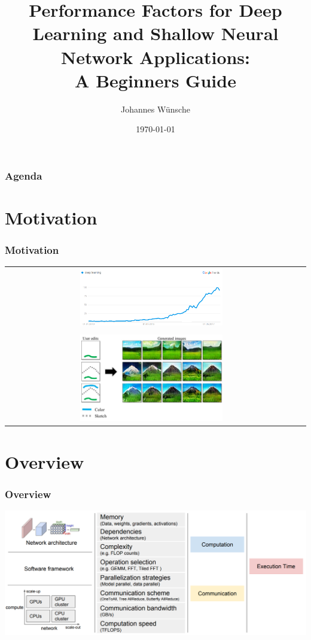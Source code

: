 \documentclass{beamer}
\title{Performance Factors for Deep Learning and Shallow Neural Network Applications: \\ A Beginners Guide}
\author{Johannes W\"{u}nsche}
\date{\today}
\institute{}
\begin{document}
\begin{frame}[plain]
 \titlepage
\end{frame}



\section[Agenda]{}
\begin{frame}
\frametitle{Agenda}
\tableofcontents
\end{frame}

\section{Motivation}
\begin{frame}
\frametitle{Motivation}
\centering
\begin{tabular}{c c}
\includegraphics[width=0.5\textwidth]{pop.png} \\\\ 
\includegraphics[width=0.5\textwidth]{demo_teaser.jpg}

 
\end{tabular}
\end{frame}



\section{Overview}
\begin{frame}
\frametitle{Overview}
\includegraphics[width=\textwidth]{PaleoModel.png}
\end{frame}
\end{document}
